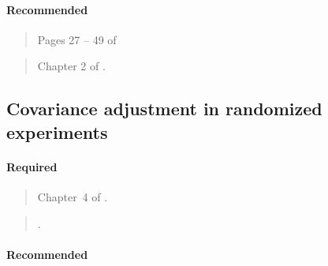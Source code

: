 \documentclass[12pt]{article}
\begin{document}
\paragraph*{Recommended}

\begin{verse}
  Pages 27 -- 49 of 
\end{verse}

\begin{verse}
  Chapter 2 of .
\end{verse}

\subsection{Covariance adjustment in randomized experiments}

\paragraph*{Required}

\begin{verse}
  Chapter~4 of .
\end{verse}

\begin{verse}
  .
\end{verse}

\begin{verse}  \end{verse}

\paragraph*{Recommended}

\begin{verse}  \end{verse}

\begin{verse}  \end{verse}

\begin{verse}  \end{verse}

\begin{verse}  \end{verse}

\begin{verse}  \end{verse}
\end{document}
